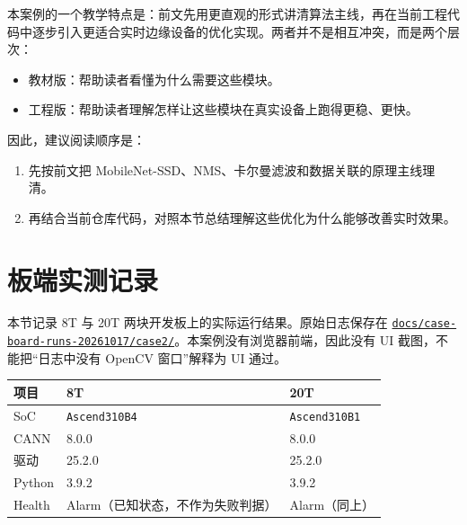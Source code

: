本案例的一个教学特点是：前文先用更直观的形式讲清算法主线，再在当前工程代码中逐步引入更适合实时边缘设备的优化实现。两者并不是相互冲突，而是两个层次：

\begin{itemize}
\tightlist
\item
  教材版：帮助读者看懂为什么需要这些模块。
\item
  工程版：帮助读者理解怎样让这些模块在真实设备上跑得更稳、更快。
\end{itemize}

因此，建议阅读顺序是：

\begin{enumerate}
\def\labelenumi{\arabic{enumi}.}
\tightlist
\item
  先按前文把 MobileNet-SSD、NMS、卡尔曼滤波和数据关联的原理主线理清。
\item
  再结合当前仓库代码，对照本节总结理解这些优化为什么能够改善实时效果。
\end{enumerate}

\section{板端实测记录}\label{src-experiment-case2-board-evidence}

本节记录 8T 与 20T 两块开发板上的实际运行结果。原始日志保存在
\href{https://github.com/zhouxzh/Ascend310/blob/main/docs/case-board-runs-20261017/case2/README.md}{\passthrough{\lstinline!docs/case-board-runs-20261017/case2/!}}。本案例没有浏览器前端，因此没有
UI 截图，不能把``日志中没有 OpenCV 窗口''解释为 UI 通过。

\begin{longtable}[]{@{}lll@{}}
\toprule\noalign{}
项目 & 8T & 20T \\
\midrule\noalign{}
\endhead
\bottomrule\noalign{}
\endlastfoot
SoC & \passthrough{\lstinline!Ascend310B4!} &
\passthrough{\lstinline!Ascend310B1!} \\
CANN & 8.0.0 & 8.0.0 \\
驱动 & 25.2.0 & 25.2.0 \\
Python & 3.9.2 & 3.9.2 \\
Health & Alarm（已知状态，不作为失败判据） & Alarm（同上） \\
\end{longtable}

